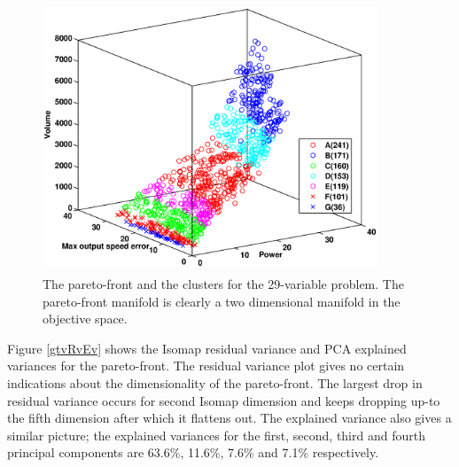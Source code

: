 \begin{figure}[ht]\begin{center}
 \includegraphics[width=100mm, height=80mm]{dia/gtvopareto2.eps}
 \caption{The pareto-front and the clusters for the 29-variable problem. The pareto-front manifold is clearly a two dimensional manifold in the objective space. }
 \label{gtvClusters}
\end{center}\end{figure}

Figure \ref{gtvRvEv} shows the Isomap residual variance and PCA explained
variances for the pareto-front. The residual variance plot gives no certain
indications about the dimensionality of the pareto-front. The largest drop
in residual variance occurs for second Isomap dimension and keeps dropping
up-to the fifth dimension after which it flattens out. The explained
variance also gives a similar picture; the explained variances for the
first, second, third and fourth principal components are 63.6\%, 11.6\%,
7.6\% and 7.1\% respectively. 


